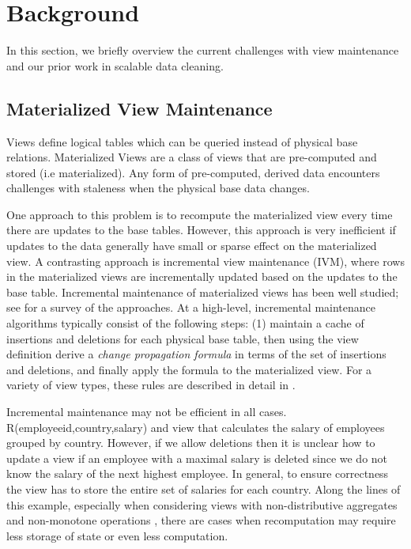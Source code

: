 \section{Background}\label{sec-background}

In this section, we briefly overview the current challenges with view maintenance and
our prior work in scalable data cleaning.

\subsection{Materialized View Maintenance}\label{subsec-inc}
Views define logical tables which can be queried instead of physical base relations.
Materialized Views are a class of views that are pre-computed and stored (i.e materialized).
Any form of pre-computed, derived data encounters challenges with staleness when the physical base data changes. 

One approach to this problem is to recompute the materialized view every time there are updates to the base tables.
However, this approach is very inefficient if updates to the data generally have small or sparse effect on the materialized view. 
A contrasting approach is incremental view maintenance (IVM), where rows in the materialized views are incrementally updated based on the updates to the base table.
Incremental maintenance of materialized views has been well studied; see \cite{chirkova2011materialized} for a survey of the approaches. 
At a high-level, incremental maintenance algorithms typically consist of the following steps: (1) maintain a cache of insertions and deletions for each physical base table, then using the view definition derive a \emph{change propagation formula} in terms of the set of insertions and deletions, and finally apply the formula to the materialized view.
For a variety of view types, these rules are described in detail in \cite{DBLP:journals/vldb/KochAKNNLS14, DBLP:conf/pods/Koch10}.

Incremental maintenance may not be efficient in all cases.
R(employeeid,country,salary) and view that calculates the \maxfunc salary of employees grouped by country. 
However, if we allow deletions then it is unclear how to update a view if an employee with a maximal salary is deleted since we do not know the salary of the next highest employee. 
In general, to ensure correctness the view has to store the entire set of salaries for each country.
Along the lines of this example, especially when considering views with non-distributive aggregates and non-monotone operations , there are 
cases when recomputation may require less storage of state or even less computation.

